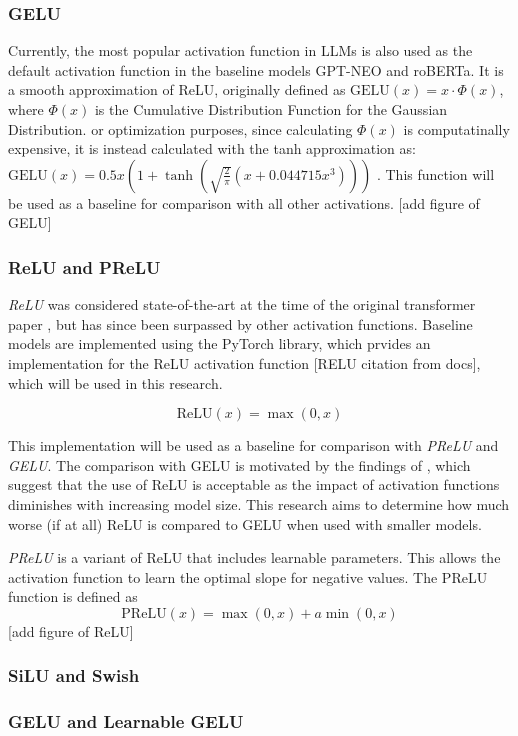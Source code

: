 \subsubsection{GELU}
Currently, the most popular activation function in LLMs is also used as the default activation function in the baseline models GPT-NEO and roBERTa. It is a smooth approximation of ReLU, originally defined as \(\text{GELU}(x) = x \cdot \Phi(x)\), where \(\Phi(x)\) is the Cumulative Distribution Function for the Gaussian Distribution. or optimization purposes, since calculating \(\Phi(x)\) is computatinally expensive, it is instead calculated with the tanh approximation as:
\(\text{GELU}(x) = 0.5x \left(1 + \tanh\left(\sqrt{\frac{2}{\pi}} \left(x + 0.044715x^3\right)\right)\right)\) \cite{Hendrycks2023}. This function will be used as a baseline for comparison with all other activations.
[add figure of GELU]

\subsubsection{ReLU and PReLU}
\textit{ReLU} was considered state-of-the-art at the time of the original transformer paper \cite{Vaswani2017}, but has since been surpassed by other activation functions. Baseline models are implemented using the PyTorch library, which prvides an implementation for the ReLU activation function [RELU citation from docs], which will be used in this research. 

\[
\text{ReLU}(x) = \max(0, x)
\]

This implementation will be used as a baseline for comparison with \textit{PReLU} and \textit{GELU}. The comparison with GELU is motivated by the findings of \citet{Mirzadeh2023}, which suggest that the use of ReLU is acceptable as the impact of activation functions diminishes with increasing model size. This research aims to determine how much worse (if at all) ReLU is compared to GELU when used with smaller models.


\textit{PReLU} is a variant of ReLU that includes learnable parameters. This allows the activation function to learn the optimal slope for negative values. The PReLU function is defined as \[\text{PReLU}(x) = \max(0, x) + a \min(0, x)\]
[add figure of ReLU]

\subsubsection{SiLU and Swish}

\subsubsection{GELU and Learnable GELU}

